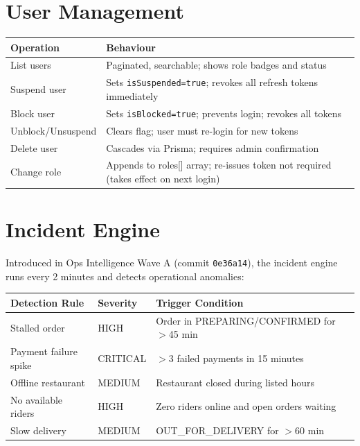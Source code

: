 \documentclass[11pt,a4paper,twoside]{book}
\newcommand{\th}[1]{\textbf{\color{white}#1}}
\begin{document}
\section{User Management}

\begin{center}\small
\begin{tabular}{p{4.5cm}p{8cm}}
\toprule
\rowcolor{headbg}\th{Operation} & \th{Behaviour} \\
\midrule
List users          & Paginated, searchable; shows role badges and status \\
\rowcolor{rowalt}Suspend user        & Sets \texttt{isSuspended=true}; revokes all refresh tokens immediately \\
Block user          & Sets \texttt{isBlocked=true}; prevents login; revokes all tokens \\
\rowcolor{rowalt}Unblock/Unsuspend   & Clears flag; user must re-login for new tokens \\
Delete user         & Cascades via Prisma; requires admin confirmation \\
\rowcolor{rowalt}Change role         & Appends to roles[] array; re-issues token not required (takes effect on next login) \\
\bottomrule
\end{tabular}
\end{center}

\section{Incident Engine}

Introduced in Ops Intelligence Wave A (commit \texttt{0e36a14}), the incident
engine runs every 2 minutes and detects operational anomalies:

\begin{center}\small
\begin{tabular}{p{4cm}p{3cm}p{5.5cm}}
\toprule
\rowcolor{headbg}\th{Detection Rule} & \th{Severity} & \th{Trigger Condition} \\
\midrule
Stalled order       & HIGH       & Order in PREPARING/CONFIRMED for $>$45 min \\
\rowcolor{rowalt}Payment failure spike & CRITICAL  & $>$3 failed payments in 15 minutes \\
Offline restaurant  & MEDIUM     & Restaurant closed during listed hours \\
\rowcolor{rowalt}No available riders & HIGH       & Zero riders online and open orders waiting \\
Slow delivery       & MEDIUM     & OUT\_FOR\_DELIVERY for $>$60 min \\
\bottomrule
\end{tabular}
\end{center}
\end{document}
